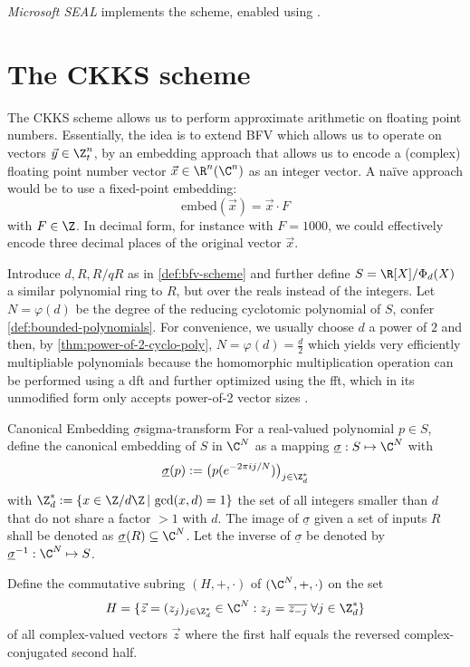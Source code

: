 \textit{Microsoft SEAL} implements the scheme, enabled using .

\section{The CKKS scheme}
The CKKS scheme allows us to perform approximate arithmetic on floating point numbers.
Essentially, the idea is to extend BFV which allows us to operate on vectors $\vec{y} \in \Z_t^n$, by an embedding approach that allows us to encode a (complex) floating point number vector $\vec{x} \in \R^n (\C^n)$ as an integer vector. A na\"ive approach would be to use a fixed-point embedding:
\newcommand{\embed}{\mathrm{embed}}
$$\embed(\vec{x}) = \vec{x} \cdot F$$
with $F \in \Z$. In decimal form, for instance with $F = 1000$, we could effectively encode three decimal places of the original vector $\vec{x}$.

Introduce $d, R, R/qR$ as in \autoref{def:bfv-scheme} and further define $S = \R[X] / \Phi_d(X)$ a similar polynomial ring to $R$, but over the reals instead of the integers.
Let $N = \varphi(d)$ be the degree of the reducing cyclotomic polynomial of $S$, confer \autoref{def:bounded-polynomials}.
For convenience, we usually choose $d$ a power of $2$ and then, by \autoref{thm:power-of-2-cyclo-poly}, $N = \varphi(d) = \frac{d}{2}$ which yields very efficiently multipliable polynomials because the homomorphic multiplication operation can be performed using a \gls{dft} and further optimized using the \gls{fft}, which in its unmodified form only accepts power-of-2 vector sizes \parencite{2017-ckks-original}.

\begin{definition}{Canonical Embedding $\underline{\sigma}$}{sigma-transform}
  For a real-valued polynomial $p \in S$, define the canonical embedding of $S$ in $\C^N$ as a mapping $\underline{\sigma}: S \mapsto \C^N$ with $$\underline{\sigma}(p) := \big(p(e^{-2\pi i j / N})\big)_{j \in \Z_d^*}$$
  with $\Z_d^* := \{x \in \Z / d\Z \,|\, \gcd(x, d) = 1\}$ the set of all integers smaller than $d$ that do not share a factor $> 1$ with $d$.
  The image of $\underline{\sigma}$ given a set of inputs $R$ shall be denoted as $\underline{\sigma}(R) \subseteq \C^N$.
  Let the inverse of $\underline{\sigma}$ be denoted by $\underline{\sigma}\inv: \C^N \mapsto S$.
\end{definition}

Define the commutative subring $(H, +, \cdot)$ of $(\C^N, +, \cdot)$ on the set
$$H = \{\vec{z} = (z_j)_{j \in \Z_d^*} \in \C^N : z_j = \overline{z_{-j}} \;\forall j \in \Z_d^*\}$$
of all complex-valued vectors $\vec{z}$ where the first half equals the reversed complex-conjugated second half.

